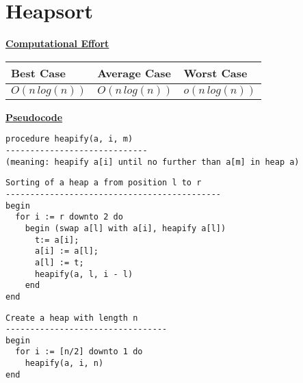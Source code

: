 \documentclass[a4paper]{report}
\begin{document}
\chapter*{Heapsort}

\underline{\bf{Computational Effort}}

\begin{tabular}{|l|l|l|}
\hline
Best Case    & Average Case  &  Worst Case\\ \hline
$O(n\,log(n))$ & $O(n\,log(n))$  &  $o(n\,log(n))$  \\ \hline
\end{tabular}

\underline{\bf{Pseudocode}}

\begin{lstlisting}
procedure heapify(a, i, m)
-----------------------------
(meaning: heapify a[i] until no further than a[m] in heap a)
\end{lstlisting}

\begin{lstlisting}
Sorting of a heap a from position l to r
--------------------------------------------
begin
  for i := r downto 2 do
    begin (swap a[l] with a[i], heapify a[l])
      t:= a[i];
      a[i] := a[l];
      a[l] := t; 
      heapify(a, l, i - l)
    end
end
\end{lstlisting}

\begin{lstlisting}
Create a heap with length n
---------------------------------
begin
  for i := [n/2] downto 1 do
    heapify(a, i, n)
end
\end{lstlisting}
\end{document}
